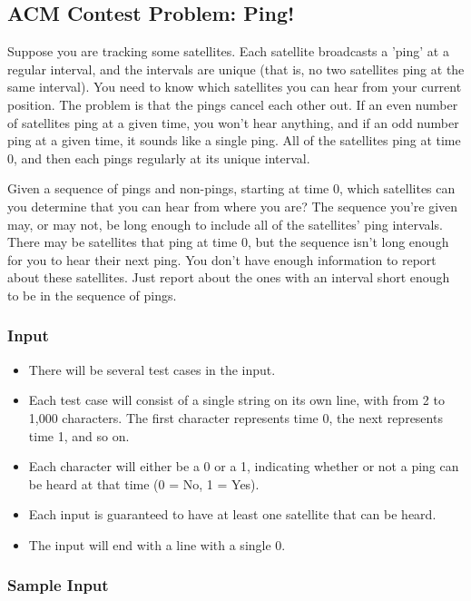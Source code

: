 \subsection{ACM Contest Problem: Ping!\cite{acmsoutheastregional2013}}
Suppose you are tracking some satellites.
Each satellite broadcasts a 'ping' at a regular interval, and the intervals are unique (that is, no two satellites ping at the same interval).
You need to know which satellites you can hear from your current position.
The problem is that the pings cancel each other out.
If an even number of satellites ping at a given time, you won't hear anything, and if an odd number ping at a given time, it sounds like a single ping.
All of the satellites ping at time 0, and then each pings regularly at its unique interval.

Given a sequence of pings and non-pings, starting at time 0, which satellites can you determine that you can hear from where you are?
The sequence you're given may, or may not, be long enough to include all of the satellites' ping intervals.
There may be satellites that ping at time 0, but the sequence isn't long enough for you to hear their next ping.
You don't have enough information to report about these satellites.
Just report about the ones with an interval short enough to be in the sequence of pings.

\subsubsection{Input}
\begin{itemize}
	\item There will be several test cases in the input.
	\item Each test case will consist of a single string on its own line, with from 2 to 1,000 characters.
	The first character represents time 0, the next represents time 1, and so on.
	\item Each character will either be a 0 or a 1, indicating whether or not a ping can be heard at that time (0 = No, 1 = Yes).
	\item Each input is guaranteed to have at least one satellite that can be heard.
	\item The input will end with a line with a single 0.
\end{itemize}

\subsubsection{Sample Input}

